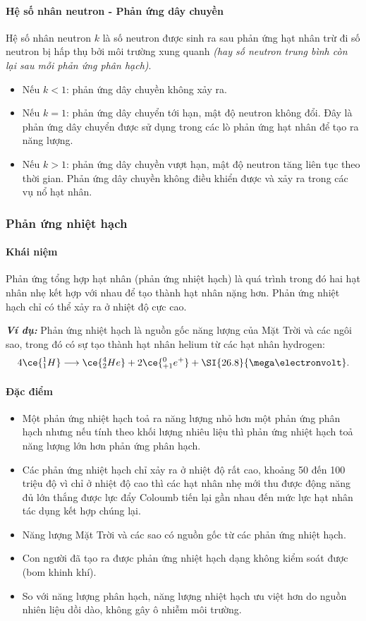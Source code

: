\begin{tomtat}
	\paragraph{Hệ số nhân neutron - Phản ứng dây chuyền}
	\begin{dn}
		Hệ số nhân neutron $k$ là số neutron được sinh ra sau phản ứng hạt nhân trừ đi số neutron bị hấp thụ bởi môi trường xung quanh \textit{(hay số neutron trung bình còn lại sau mỗi phản ứng phân hạch)}.
	\end{dn}
	\begin{itemize}
		\item Nếu $k<1$: phản ứng dây chuyền không xảy ra.
		\item Nếu $k=1$: phản ứng dây chuyển tới hạn, mật độ neutron không đổi. Đây là phản ứng dây chuyển được sử dụng trong các lò phản ứng hạt nhân để tạo ra năng lượng.
		\item Nếu $k>1$: phản ứng dây chuyền vượt hạn, mật độ neutron tăng liên tục theo thời gian. Phản ứng dây chuyền không điều khiển được và xảy ra trong các vụ nổ hạt nhân.
	\end{itemize}
	\subsubsection{Phản ứng nhiệt hạch}
	\paragraph{Khái niệm}
	\begin{dn}
		Phản ứng tổng hợp hạt nhân (phản ứng nhiệt hạch) là quá trình trong đó hai hạt nhân nhẹ kết hợp với nhau để tạo thành hạt nhân nặng hơn. Phản ứng nhiệt hạch chỉ có thể xảy ra ở nhiệt độ cực cao.
	\end{dn}
	\textbf{\textit{Ví dụ:}} Phản ứng nhiệt hạch là nguồn gốc năng lượng của Mặt Trời và các ngôi sao, trong đó có sự tạo thành hạt nhân helium từ các hạt nhân hydrogen:
	$$4\ce{^1_1H}\longrightarrow \ce{^4_2He}+2\ce{^0_{+1}e^+}+\SI{26.8}{\mega\electronvolt}.$$
	\paragraph{Đặc điểm}
	\begin{itemize}
		\item Một phản ứng nhiệt hạch toả ra năng lượng nhỏ hơn một phản ứng phân hạch nhưng nếu tính theo khối lượng nhiêu liệu thì phản ứng nhiệt hạch toả năng lượng lớn hơn phản ứng phân hạch.
		\item Các phản ứng nhiệt hạch chỉ xảy ra ở nhiệt độ rất cao, khoảng 50 đến 100 triệu độ vì chỉ ở nhiệt độ cao thì các hạt nhân nhẹ mới thu được động năng đủ lớn thắng được lực đẩy Coloumb tiến lại gần nhau đến mức lực hạt nhân tác dụng kết hợp chúng lại.
		\item Năng lượng Mặt Trời và các sao có nguồn gốc từ các phản ứng nhiệt hạch.
		\item Con người đã tạo ra được phản ứng nhiệt hạch dạng không kiểm soát được (bom khinh khí).
		\item So với năng lượng phân hạch, năng lượng nhiệt hạch ưu việt hơn do nguồn nhiên liệu dồi dào, không gây ô nhiễm môi trường.
	\end{itemize}

\end{tomtat}
